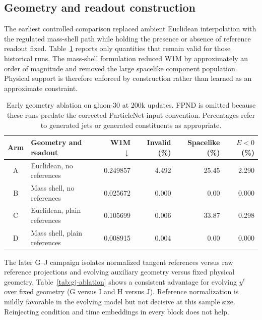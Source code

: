 \documentclass[10pt]{article}
\begin{document}
\subsection{Geometry and readout construction}

The earliest controlled comparison replaced ambient Euclidean interpolation with the
regulated mass-shell path while holding the presence or absence of reference readout
fixed. Table~\ref{tab:geometry-ablation} reports only quantities that remain valid for
those historical runs. The mass-shell formulation reduced W1M by approximately an
order of magnitude and removed the large spacelike component population. Physical
support is therefore enforced by construction rather than learned as an approximate
constraint.

\begin{table}[H]
\centering
\caption{Early geometry ablation on gluon-30 at 200k updates. FPND is omitted because
these runs predate the corrected ParticleNet input convention. Percentages refer to
generated jets or generated constituents as appropriate.}
\label{tab:geometry-ablation}
\small
\begin{tabular}{clrrrr}
\toprule
Arm & Geometry and readout & W1M $\downarrow$ & Invalid (\%) & Spacelike (\%) & $E<0$ (\%) \\
\midrule
A & Euclidean, no references       & 0.249857 & 4.492 & 25.45 & 2.290 \\
B & Mass shell, no references      & 0.025672 & 0.000 &  0.00 & 0.000 \\
C & Euclidean, plain references    & 0.105699 & 0.006 & 33.87 & 0.298 \\
D & Mass shell, plain references   & 0.008915 & 0.004 &  0.00 & 0.000 \\
\bottomrule
\end{tabular}
\end{table}

The later G--J campaign isolates normalized tangent references versus raw reference
projections and evolving auxiliary geometry versus fixed physical geometry.
Table~\ref{tab:gj-ablation} shows a consistent advantage for evolving $y^\ell$ over
fixed geometry (G versus I and H versus J). Reference normalization is mildly favorable
in the evolving model but not decisive at this sample size. Reinjecting condition and
time embeddings in every block does not help.
\end{document}
